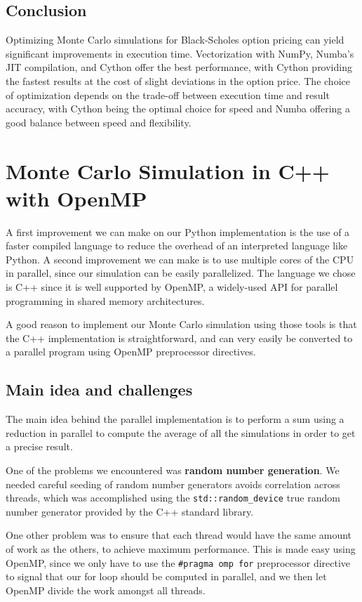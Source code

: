 \documentclass[12pt,a4paper]{report}
\begin{document}
\subsection{Conclusion}

Optimizing Monte Carlo simulations for Black-Scholes option pricing can yield significant improvements in execution time. Vectorization with NumPy, Numba's JIT compilation, and Cython offer the best performance, with Cython providing the fastest results at the cost of slight deviations in the option price. The choice of optimization depends on the trade-off between execution time and result accuracy, with Cython being the optimal choice for speed and Numba offering a good balance between speed and flexibility.

\section{Monte Carlo Simulation in C++ with OpenMP}

A first improvement we can make on our Python implementation is the use of a faster compiled language to reduce the overhead of an interpreted language like Python.
A second improvement we can make is to use multiple cores of the CPU in parallel, since our simulation can be easily parallelized.
The language we chose is C++ since it is well supported by OpenMP, a widely-used API for parallel programming in shared memory architectures. 

A good reason to implement our Monte Carlo simulation using those tools is that the C++ implementation is straightforward, and can very easily be converted to a parallel program using OpenMP preprocessor directives.

\subsection{Main idea and challenges}

The main idea behind the parallel implementation is to perform a sum using a reduction in parallel to compute the average of all the simulations in order to get a precise result.

One of the problems we encountered was \textbf{random number generation}. We needed careful seeding of random number generators avoids correlation across threads, which was accomplished using the {\tt std::random\_device} true random number generator provided by the C++ standard library.

One other problem was to ensure that each thread would have the same amount of work as the others, to achieve maximum performance. This is made easy using OpenMP, since we only have to use the {\tt \#pragma omp for} preprocessor directive to signal that our for loop should be computed in parallel, and we then let OpenMP divide the work amongst all threads.
\end{document}

